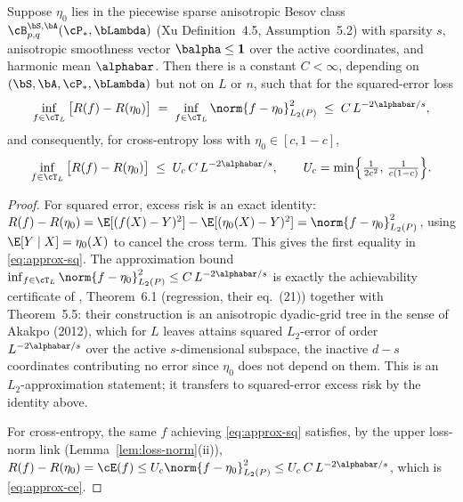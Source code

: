 
\begin{lemma}\label{lem:approx}
Suppose $\eta_0$ lies in the piecewise sparse anisotropic Besov class
$\cB^{\bS,\bA}_{p,q}(\cP_*, \bLambda)$ (Xu Definition~4.5, Assumption~5.2) with
sparsity $s$, anisotropic smoothness vector $\balpha \le \mathbf 1$ over the
active coordinates, and harmonic mean $\alphabar$. Then there is a constant
$C < \infty$, depending on $(\bS,\bA,\cP_*,\bLambda)$ but not on $L$ or $n$,
such that for the squared-error loss
\begin{equation}\label{eq:approx-sq}
  \inf_{f \in \cT_L}\, \bigl[ R(f) - R(\eta_0) \bigr]
  \;=\; \inf_{f \in \cT_L} \norm{f - \eta_0}_{L_2(P)}^2
  \;\le\; C\, L^{-2\alphabar/s},
\end{equation}
and consequently, for cross-entropy loss with $\eta_0 \in [c,1-c]$,
\begin{equation}\label{eq:approx-ce}
  \inf_{f \in \cT_L}\, \bigl[ R(f) - R(\eta_0) \bigr]
  \;\le\; U_c\, C\, L^{-2\alphabar/s},
  \qquad U_c = \min\Bigl\{\tfrac{1}{2c^2},\, \tfrac{1}{c(1-c)}\Bigr\}.
\end{equation}
\end{lemma}

\begin{proof}
For squared error, excess risk is an exact identity:
$R(f) - R(\eta_0) = \E[(f(X) - Y)^2] - \E[(\eta_0(X) - Y)^2]
= \norm{f - \eta_0}_{L_2(P)}^2$, using $\E[Y \mid X] = \eta_0(X)$ to cancel the
cross term. This gives the first equality in \eqref{eq:approx-sq}. The
approximation bound $\inf_{f \in \cT_L}\norm{f-\eta_0}_{L_2(P)}^2 \le C\,
L^{-2\alphabar/s}$ is exactly the achievability certificate of
\citet{xuStatisticalOptimalityOptimal2026}, Theorem~6.1 (regression, their
eq.~(21)) together with Theorem~5.5: their construction is an anisotropic
dyadic-grid tree in the sense of Akakpo (2012), which for $L$ leaves attains
squared $L_2$-error of order $L^{-2\alphabar/s}$ over the active $s$-dimensional
subspace, the inactive $d - s$ coordinates contributing no error since $\eta_0$
does not depend on them. This is an $L_2$-approximation statement; it transfers
to squared-error excess risk by the identity above.

For cross-entropy, the same $f$ achieving \eqref{eq:approx-sq} satisfies, by the
upper loss-norm link (Lemma~\ref{lem:loss-norm}(ii)),
$R(f) - R(\eta_0) = \cE(f) \le U_c \norm{f - \eta_0}_{L_2(P)}^2
\le U_c\, C\, L^{-2\alphabar/s}$, which is \eqref{eq:approx-ce}.
\end{proof}

